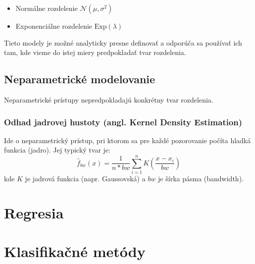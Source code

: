 \begin{itemize}
  \item Normálne rozdelenie $\mathcal{N}(\mu, \sigma^2)$
  \item Exponenciálne rozdelenie $\text{Exp}(\lambda)$
\end{itemize}

Tieto modely je možné analyticky presne definovať a odporúča sa používať ich tam, kde vieme do istej miery predpokladať tvar rozdelenia.

\subsection{Neparametrické modelovanie}

Neparametrické prístupy nepredpokladajú konkrétny tvar rozdelenia.

\subsubsection{Odhad jadrovej hustoty (angl. Kernel Density Estimation)}

Ide o neparametrický prístup, pri ktorom sa pre každé pozorovanie počíta hladká funkcia (jadro). Jej typický tvar je:
\[
\hat{f}_{bw}(x) = \frac{1}{n*bw} \sum_{i=1}^n K\left( \frac{x - x_i}{bw} \right)
\]
kde $K$ je jadrová funkcia (napr. Gaussovská) a $bw$ je šírka pásma (bandwidth).

\section{Regresia}\label{sec:regresia}

\section{Klasifikačné metódy}\label{sec:klas_metody}